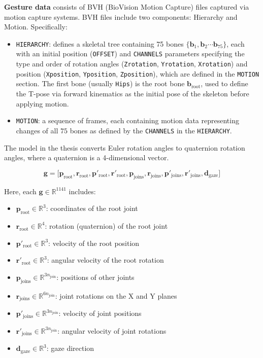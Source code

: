 \textbf{Gesture data} consists of BVH (BioVision Motion Capture) files captured via motion capture systems. BVH files include two components: Hierarchy and Motion. Specifically:

\begin{itemize}
	\item \texttt{HIERARCHY}: defines a skeletal tree containing 75 bones $\{ \mathbf{b}_1, \mathbf{b}_2 \cdots \mathbf{b}_{75} \}$, each with an initial position (\texttt{OFFSET}) and \texttt{CHANNELS} parameters specifying the type and order of rotation angles (\texttt{Zrotation}, \texttt{Yrotation}, \texttt{Xrotation}) and position (\texttt{Xposition}, \texttt{Yposition}, \texttt{Zposition}), which are defined in the \texttt{MOTION} section. The first bone (usually \texttt{Hips}) is the root bone $\mathbf{b}_{\text{root}}$, used to define the T-pose via forward kinematics as the initial pose of the skeleton before applying motion.
	
	\item \texttt{MOTION}: a sequence of frames, each containing motion data representing changes of all $75$ bones as defined by the \texttt{CHANNELS} in the \texttt{HIERARCHY}.
\end{itemize}

The model in the thesis converts Euler rotation angles to quaternion rotation angles, where a quaternion is a 4-dimensional vector.

\begin{equation} \label{eq:gesturevector}
	\mathbf{g} = \Big[ \mathbf{p}_{\text{root}},  \mathbf{r}_{\text{root}},
	\mathbf{ p }'_{\text{root}},  \mathbf{r}'_{\text{root}},
	\mathbf{p}_{\text{joins}},  \mathbf{r}_{\text{joins}},
	\mathbf{p}'_{\text{joins}},  \mathbf{r}'_{\text{joins}},
	\mathbf{d}_{\text{gaze}}
	\Big]
\end{equation}

Here, each $\mathbf{g} \in \mathbb{R}^{1141}$ includes:
{
	\begin{itemize}
		\item $\mathbf{p}_{\text{root}} \in \mathbb{R}^3$: coordinates of the root joint
		\item $\mathbf{r}_{\text{root}} \in \mathbb{R}^4$: rotation (quaternion) of the root joint
		\item $\mathbf{p}'_{\text{root}} \in \mathbb{R}^3$: velocity of the root position
		\item $\mathbf{r}'_{\text{root}} \in \mathbb{R}^3$: angular velocity of the root rotation
		
		\item $\mathbf{p}_{\text{joins}} \in \mathbb{R}^{3 n_{\text{join} }}$: positions of other joints
		\item $\mathbf{r}_{\text{joins}} \in \mathbb{R}^{6 n_{\text{join} }}$: joint rotations on the X and Y planes
		\item $\mathbf{p}'_{\text{joins}} \in \mathbb{R}^{3n_{\text{join} }}$: velocity of joint positions
		\item $\mathbf{r}'_{\text{joins}} \in \mathbb{R}^{3n_{\text{join} }}$: angular velocity of joint rotations
		\item $\mathbf{d}_{\text{gaze}} \in \mathbb{R}^3$: gaze direction
\end{itemize}}

